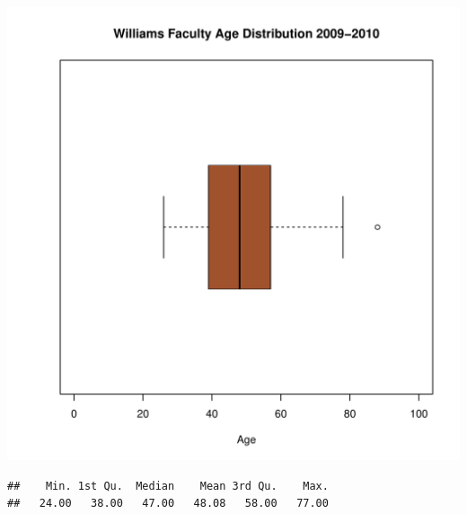 \documentclass[12pt,a4paper]{article}\usepackage[]{graphicx}\usepackage[]{color}
\makeatletter
\def\maxwidth{ %
  \ifdim\Gin@nat@width>\linewidth
    \linewidth
  \else
    \Gin@nat@width
  \fi
}
\newenvironment{kframe}{%
 \def\at@end@of@kframe{}%
 \ifinner\ifhmode%
  \def\at@end@of@kframe{\end{minipage}}%
  \begin{minipage}{\columnwidth}%
 \fi\fi%
 \def\FrameCommand##1{\hskip\@totalleftmargin \hskip-\fboxsep
 \colorbox{shadecolor}{##1}\hskip-\fboxsep
     \hskip-\linewidth \hskip-\@totalleftmargin \hskip\columnwidth}%
 \MakeFramed {\advance\hsize-\width
   \@totalleftmargin\z@ \linewidth\hsize
   \@setminipage}}%
 {\par\unskip\endMakeFramed%
 \at@end@of@kframe}
\newenvironment{knitrout}{}{} %
\theoremstyle{definition}
\makeatother
\begin{document}
\begin{knitrout}
\color{fgcolor}
\includegraphics[width=\maxwidth]{figure/unnamed-chunk-44-1} 

\end{knitrout}

\begin{knitrout}
\color{fgcolor}\begin{kframe}
\begin{verbatim}
##    Min. 1st Qu.  Median    Mean 3rd Qu.    Max. 
##   24.00   38.00   47.00   48.08   58.00   77.00
\end{verbatim}
\end{kframe}
\end{knitrout}
\end{document}
